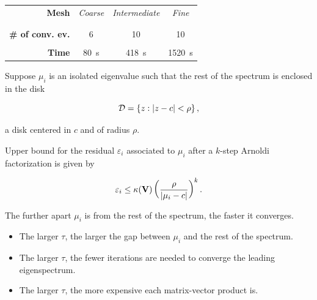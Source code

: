 \documentclass[aspectratio=169, usenames, dvipsnames]{beamer}
\begin{document}
{\begin{frame}
\begin{minipage}{.68\textwidth}
      \bigskip
      
      \begin{tabular}{rccc}
        \textbf{Mesh} & \emph{Coarse} & \emph{Intermediate} & \emph{Fine} \\
        \\
        \hline \\
        \textbf{\# of conv. ev.} & 6 & 10 & 10 \\
        \\
        \textbf{Time} & 80~\unit{\s} & 418~\unit{\s} & 1520~\unit{\s}
      \end{tabular}
    \end{minipage}
    \vfill
  \end{frame}  
}

\begin{frame}
  \vfill
  Suppose $\mu_i$ is an isolated eigenvalue such that the rest of the spectrum is enclosed in the disk
  
  \bigskip
  
  {
    \Large
    \[
      \mathcal{D} = \left\{ z : \abs{z-c} < \rho \right\},
    \]
  }
  
  \bigskip
    
  \ie{} a disk centered in $c$ and of radius $\rho$.
  \vfill
\end{frame}

\begin{frame}
  \vfill

  Upper bound for the residual $\varepsilon_i$ associated to $\mu_i$ after a $k$-step Arnoldi factorization is given by

  {
    \Large
    \[
      \varepsilon_i \leq \kappa(\vb{V}) \left( \dfrac{\rho}{\abs{\mu_i - c}} \right)^k.
    \]
  }

  \bigskip
  
  The further apart $\mu_i$ is from the rest of the spectrum, the faster it converges.
  
  \vfill
\end{frame}

\begin{frame}
  \vfill
  \begin{itemize}
  \item The larger $\tau$, the larger the gap between $\mu_i$ and the rest of the spectrum.
    
    \bigskip
    
  \item The larger $\tau$, the fewer iterations are needed to converge the leading eigenspectrum.
    
    \bigskip
    
  \item The larger $\tau$, the more expensive each matrix-vector product is.
  \end{itemize}
  \vfill
\end{frame}
\end{document}
